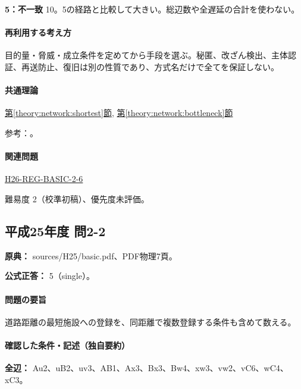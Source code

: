 \noindent\textbf{5：不一致} 10。5の経路と比較して大きい。総辺数や全遅延の合計を使わない。\par

\paragraph{再利用する考え方} 目的量・脅威・成立条件を定めてから手段を選ぶ。秘匿、改ざん検出、主体認証、再送防止、復旧は別の性質であり、方式名だけで全てを保証しない。

\paragraph{共通理論} \hyperref[theory:network:shortest]{第\ref*{theory:network:shortest}節}, \hyperref[theory:network:bottleneck]{第\ref*{theory:network:bottleneck}節}

\par 参考：\cite{net_dijkstra}。

\paragraph{関連問題} \hyperref[q:h26-reg-basic-2-6]{H26-REG-BASIC-2-6}

\par 難易度 2（校準初稿）、優先度未評価。

\subsection{平成25年度 問2-2}
\label{q:h25-reg-basic-2-2}

\noindent\textbf{原典：} sources/H25/basic.pdf、PDF物理7頁。

\textbf{公式正答：} 5（single）。

\paragraph{問題の要旨} 道路距離の最短施設への登録を、同距離で複数登録する条件も含めて数える。

\paragraph{確認した条件・記述（独自要約）}\mbox{}\par

\noindent\textbf{全辺：} Au2、uB2、uv3、AB1、Ax3、Bx3、Bw4、xw3、vw2、vC6、wC4、xC3。\par

